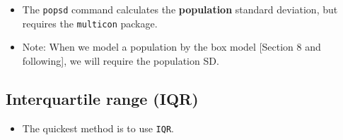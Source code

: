 \documentclass[]{article}
\newenvironment{Shaded}{\begin{snugshade}}{\end{snugshade}}
\newcommand{\CommentTok}[1]{\textcolor[rgb]{0.56,0.35,0.01}{\textit{#1}}}
\newcommand{\DecValTok}[1]{\textcolor[rgb]{0.00,0.00,0.81}{#1}}
\newcommand{\KeywordTok}[1]{\textcolor[rgb]{0.13,0.29,0.53}{\textbf{#1}}}
\newcommand{\NormalTok}[1]{#1}
\newcommand{\OperatorTok}[1]{\textcolor[rgb]{0.81,0.36,0.00}{\textbf{#1}}}
\newcommand{\StringTok}[1]{\textcolor[rgb]{0.31,0.60,0.02}{#1}}
\providecommand{\tightlist}{%
  \setlength{\itemsep}{0pt}\setlength{\parskip}{0pt}}
\begin{document}
\begin{Shaded}
\end{Shaded}

\begin{itemize}
\tightlist
\item
  The \texttt{popsd} command calculates the \textbf{population} standard deviation, but requires the \texttt{multicon} package.
\end{itemize}

\begin{Shaded}
\end{Shaded}

\begin{itemize}
\tightlist
\item
  Note: When we model a population by the box model {[}Section 8 and following{]}, we will require the population SD.
\end{itemize}

\hypertarget{interquartile-range-iqr}{%
\subsection{Interquartile range (IQR)}\label{interquartile-range-iqr}}

\begin{itemize}
\tightlist
\item
  The quickest method is to use \texttt{IQR}.
\end{itemize}

\begin{Shaded}
\end{Shaded}
\end{document}
